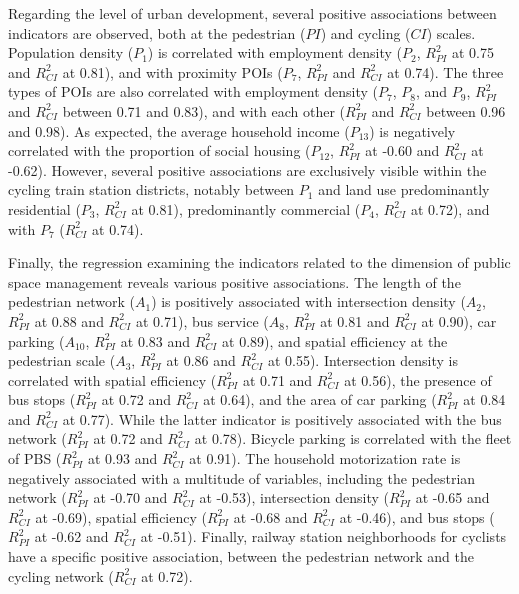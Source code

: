 \begin{refsegment}
Regarding the level of urban development, several positive associations between indicators are observed, both at the pedestrian (\(PI\)) and cycling (\(CI\)) scales. Population density (\(P_{1}\)) is correlated with employment density (\(P_{2}\), \(R^{2}_{PI}\) at 0.75 and \(R^{2}_{CI}\) at 0.81), and with proximity \acrshort{POIs} (\(P_{7}\), \(R^{2}_{PI}\) and \(R^{2}_{CI}\) at 0.74). The three types of \acrshort{POIs} are also correlated with employment density (\(P_{7}\), \(P_{8}\), and \(P_{9}\), \(R^{2}_{PI}\) and \(R^{2}_{CI}\) between 0.71 and 0.83), and with each other (\(R^{2}_{PI}\) and \(R^{2}_{CI}\) between 0.96 and 0.98). As expected, the average household income (\(P_{13}\)) is negatively correlated with the proportion of social housing (\(P_{12}\), \(R^{2}_{PI}\) at -0.60 and \(R^{2}_{CI}\) at -0.62). However, several positive associations are exclusively visible within the cycling train station districts, notably between \(P_{1}\) and land use predominantly residential (\(P_{3}\), \(R^{2}_{CI}\) at 0.81), predominantly commercial (\(P_{4}\), \(R^{2}_{CI}\) at 0.72), and with \(P_{7}\) (\(R^{2}_{CI}\) at 0.74).%

Finally, the regression examining the indicators related to the dimension of public space management reveals various positive associations. The length of the pedestrian network (\(A_{1}\)) is positively associated with intersection density (\(A_{2}\), \(R^{2}_{PI}\) at 0.88 and \(R^{2}_{CI}\) at 0.71), bus service (\(A_{8}\), \(R^{2}_{PI}\) at 0.81 and \(R^{2}_{CI}\) at 0.90), car parking (\(A_{10}\), \(R^{2}_{PI}\) at 0.83 and \(R^{2}_{CI}\) at 0.89), and spatial efficiency at the pedestrian scale (\(A_{3}\), \(R^{2}_{PI}\) at 0.86 and \(R^{2}_{CI}\) at 0.55). Intersection density is correlated with spatial efficiency (\(R^{2}_{PI}\) at 0.71 and \(R^{2}_{CI}\) at 0.56), the presence of bus stops (\(R^{2}_{PI}\) at 0.72 and \(R^{2}_{CI}\) at 0.64), and the area of car parking (\(R^{2}_{PI}\) at 0.84 and \(R^{2}_{CI}\) at 0.77). While the latter indicator is positively associated with the bus network (\(R^{2}_{PI}\) at 0.72 and \(R^{2}_{CI}\) at 0.78). Bicycle parking is correlated with the fleet of \acrshort{PBS} (\(R^{2}_{PI}\) at 0.93 and \(R^{2}_{CI}\) at 0.91). The household motorization rate is negatively associated with a multitude of variables, including the pedestrian network (\(R^{2}_{PI}\) at -0.70 and \(R^{2}_{CI}\) at -0.53), intersection density (\(R^{2}_{PI}\) at -0.65 and \(R^{2}_{CI}\) at -0.69), spatial efficiency (\(R^{2}_{PI}\) at -0.68 and \(R^{2}_{CI}\) at -0.46), and bus stops (\(R^{2}_{PI}\) at -0.62 and \(R^{2}_{CI}\) at -0.51). Finally, railway station neighborhoods for cyclists have a specific positive association, between the pedestrian network and the cycling network (\(R^{2}_{CI}\) at 0.72).%


\end{refsegment}
